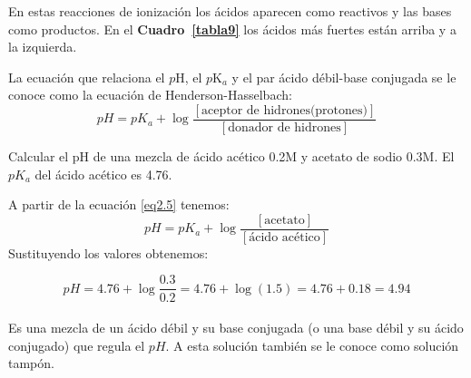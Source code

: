  En estas reacciones de ionizaci\'on los \'acidos aparecen como reactivos y las bases como productos.
 En el \textbf{Cuadro~\ref{tabla9}} los \'acidos m\'as fuertes est\'an arriba y a la izquierda.

La ecuaci\'on que relaciona el $p$H, el $p$K$_a$  y el par
\'acido d\'ebil-base conjugada se le conoce como la ecuaci\'on de
Henderson-Hasselbach:
\begin{equation}
pH = pK_a + \log
\frac{[\textrm{aceptor de hidrones(protones)}]}
{[\textrm{donador de hidrones}]}
\label{eq2.5}
\end{equation}

\begin{example}
 Calcular el pH de una mezcla de \'acido ac\'etico 0.2M y acetato de sodio 0.3M. El $pK_a$ del \'acido ac\'etico es 4.76.

A partir de la ecuaci\'on \ref{eq2.5} tenemos:
$$ pH = pK_a + \log \frac{[\textrm{acetato}]}{{[\textrm{
\'acido ac\'etico}]}}$$ Sustituyendo los valores obtenemos:

$$pH = 4.76 + \log \frac{0.3}{0.2} = 4.76 + \log(1.5) = 4.76 +
0.18=4.94$$
\end{example}

\paragraph{}Es una mezcla de un \'acido d\'ebil y su base conjugada (o una base d\'e\-bil y su \'acido conjugado) que regula el $pH$. A esta soluci\'on tambi\'en se le conoce como soluci\'on tamp\'on.
\pagebreak

